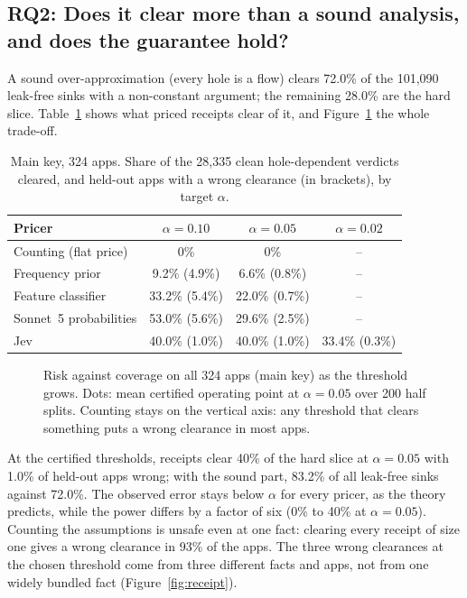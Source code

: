 \subsection{RQ2: Does it clear more than a sound analysis, and does the guarantee hold?}
\label{sec:rq2}
A sound over-approximation (every hole is a flow) clears 72.0\% of the 101{,}090 leak-free sinks with a non-constant argument; the remaining 28.0\% are the hard slice.
Table~\ref{tab:main} shows what priced receipts clear of it, and Figure~\ref{fig:curve} the whole trade-off.
\begin{table}[t]
\caption{Main key, 324 apps. Share of the 28{,}335 clean hole-dependent verdicts cleared, and held-out apps with a wrong clearance (in brackets), by target $\alpha$.}
\label{tab:main}
\small
\begin{tabular}{@{}lccc@{}}
\toprule
Pricer & $\alpha{=}0.10$ & $\alpha{=}0.05$ & $\alpha{=}0.02$\\
\midrule
Counting (flat price) & 0\% & 0\% & --\\
Frequency prior & 9.2\% (4.9\%) & 6.6\% (0.8\%) & --\\
Feature classifier & 33.2\% (5.4\%) & 22.0\% (0.7\%) & --\\
Sonnet~5 probabilities & 53.0\% (5.6\%) & 29.6\% (2.5\%) & --\\
Jev & 40.0\% (1.0\%) & 40.0\% (1.0\%) & 33.4\% (0.3\%)\\
\bottomrule
\end{tabular}
\end{table}
\begin{figure}[t]

\caption{Risk against coverage on all 324 apps (main key) as the threshold grows. Dots: mean certified operating point at $\alpha=0.05$ over 200 half splits. Counting stays on the vertical axis: any threshold that clears something puts a wrong clearance in most apps.}
\label{fig:curve}
\end{figure}
At the certified thresholds, receipts clear 40\% of the hard slice at $\alpha=0.05$ with 1.0\% of held-out apps wrong; with the sound part, 83.2\% of all leak-free sinks against 72.0\%.
The observed error stays below $\alpha$ for every pricer, as the theory predicts, while the power differs by a factor of six (0\% to 40\% at $\alpha=0.05$).
Counting the assumptions is unsafe even at one fact: clearing every receipt of size one gives a wrong clearance in 93\% of the apps.
The three wrong clearances at the chosen threshold come from three different facts and apps, not from one widely bundled fact (Figure~\ref{fig:receipt}).


